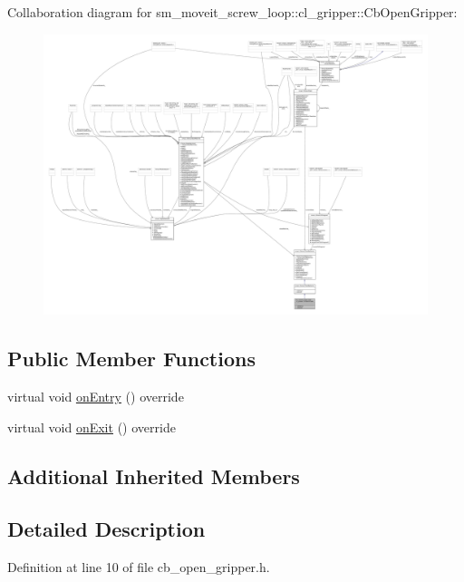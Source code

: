 Collaboration diagram for sm\+\_\+moveit\+\_\+screw\+\_\+loop\+:\+:cl\+\_\+gripper\+:\+:Cb\+Open\+Gripper\+:
\nopagebreak
\begin{figure}[H]
\begin{center}
\leavevmode
\includegraphics[width=350pt]{classsm__moveit__screw__loop_1_1cl__gripper_1_1CbOpenGripper__coll__graph}
\end{center}
\end{figure}
\subsection*{Public Member Functions}
\begin{DoxyCompactItemize}
\item 
virtual void \hyperlink{classsm__moveit__screw__loop_1_1cl__gripper_1_1CbOpenGripper_af662bd9f6e0d190bcfc7f8d2168cee79}{on\+Entry} () override
\item 
virtual void \hyperlink{classsm__moveit__screw__loop_1_1cl__gripper_1_1CbOpenGripper_a8d96045446ec442d9cb24bcf958eef03}{on\+Exit} () override
\end{DoxyCompactItemize}
\subsection*{Additional Inherited Members}


\subsection{Detailed Description}


Definition at line 10 of file cb\+\_\+open\+\_\+gripper.\+h.




